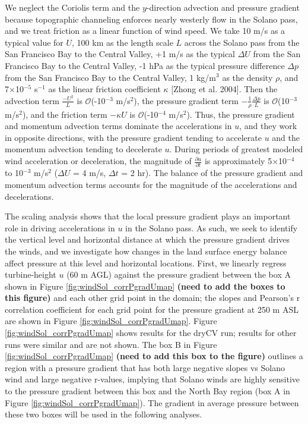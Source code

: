 We neglect the Coriolis term and the $y$-direction advection and pressure gradient because topographic channeling enforces nearly westerly flow in the Solano pass, and we treat friction as a linear function of wind speed.  We take 10 m/s as a typical value for $U$, 100 km as the length scale $L$ across the Solano pass from the San Francisco Bay to the Central Valley, +1 m/s as the typical $\Delta U$ from the San Francisco Bay to the Central Valley, -1 hPa as the typical pressure difference $\Delta p$ from the San Francisco Bay to the Central Valley, 1 kg/m$^3$ as the density $\rho$, and 7$\times$10$^{-5}$ s$^{-1}$ as the linear friction coefficient $\kappa$ [Zhong et al. 2004]. Then the advection term $\frac{-U^2}{L}$ is $\mathcal{O}$(-10$^{-3}$ m/s$^2$), the pressure gradient term $-\frac{1}{\rho} \frac{\Delta p}{L}$ is $\mathcal{O}$(10$^{-3}$ m/s$^2$), and the friction term $-\kappa U$ is $\mathcal{O}$(-10$^{-4}$ m/s$^2$).  Thus, the pressure gradient and momentum advection terms dominate the accelerations in $u$, and they work in opposite directions, with the pressure gradient tending to accelerate $u$ and the momentum advection tending to decelerate $u$.  During periods of greatest modeled wind acceleration or deceleration, the magnitude of $\frac{\partial u}{\partial t}$ is approximately 5$\times$10$^{-4}$ to 10$^{-3}$ m/s$^2$ ($\Delta U$ = 4 m/s, $\Delta t$ = 2 hr).  The balance of the pressure gradient and momentum advection terms accounts for the magnitude of the accelerations and decelerations.

The scaling analysis shows that the local pressure gradient plays an important role in driving accelerations in $u$ in the Solano pass.  As such, we seek to identify the vertical level and horizontal distance at which the pressure gradient drives the winds, and we investigate how changes in the land surface energy balance affect pressure at this level and horizontal locations.  First, we linearly regress turbine-height $u$ (60 m AGL) against the pressure gradient between the box A shown in Figure \ref{fig:windSol_corrPgradUmap} \textbf{(need to add the boxes to this figure)} and each other grid point in the domain; the slopes and Pearson's r correlation coefficient for each grid point for the pressure gradient at 250 m ASL are shown in Figure \ref{fig:windSol_corrPgradUmap}.  Figure \ref{fig:windSol_corrPgradUmap} shows results for the dryCV run; results for other runs were similar and are not shown.  The box B in Figure \ref{fig:windSol_corrPgradUmap} \textbf{(need to add this box to the figure)} outlines a region with a pressure gradient that has both large negative slopes vs Solano wind and large negative r-values, implying that Solano winds are highly sensitive to the pressure gradient between this box and the North Bay region (box A in Figure \ref{fig:windSol_corrPgradUmap}).  The gradient in average pressure between these two boxes will be used in the following analyses.

